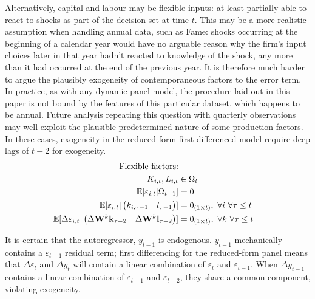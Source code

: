 Alternatively, capital and labour may be flexible inputs:
at least partially able to react to shocks
as part of the decision set at time $t$.
This may be a more realistic assumption when handling annual data, such as Fame:
shocks occurring at the beginning of a calendar year would have no arguable
reason why the firm's input choices later in that year hadn't reacted to knowledge of the shock,
any more than it had occurred at the end of the previous year.
It is therefore much harder to argue the plausibly exogeneity of contemporaneous factors to the error term.
In practice, as with any dynamic panel model, the procedure laid out in this paper
is not bound by the features of this particular dataset, which happens to be annual.
Future analysis repeating this question with quarterly observations may well
exploit the plausible predetermined nature of some production factors.
In these cases, exogeneity in the reduced form first-differenced model
require deep lags of $t-2$ for exogeneity.
\begin{align}
    \notag
    \text{Flexible factors:}
    \\ \notag
    K_{i,t}, L_{i,t} &\in \Omega_{t}
    \\ \notag
    \mathbb E[\varepsilon_{i,t}|\Omega_{t-1}] &= 0 
    \\
    \label{eq:dyn-weak-exog-flex}
    \mathbb E[
        \varepsilon_{i,t}
        \vert
        \begin{pmatrix}
            k_{i,\tau-1} & l_{\tau-1}
        \end{pmatrix}
    ] &= 0_{(1\times t)}
    ,\ \forall i\ \forall \tau\leq t
    \\
    \label{eq:dyn-weak-exog-flex-diff}
    \mathbb E[
        \Delta\varepsilon_{i,t}
        \vert
        \begin{pmatrix}
            \Delta \mathbf W^k\mathbf k_{\tau-2} & \Delta \mathbf W^k \mathbf l_{\tau-2}
        \end{pmatrix}
    ] &= 0_{(1\times t)}
    ,\ \forall k\ \forall \tau\leq t
\end{align}
\par
It is certain that the autoregressor, $y_{t-1}$ is endogenous.
$y_{t-1}$ mechanically contains a $\varepsilon_{t-1}$ residual term;
first differencing for the reduced-form panel means that $\Delta\varepsilon_t$
and $\Delta y_t$ will contain a linear combination of $\varepsilon_t$ and $\varepsilon_{t-1}$.
When $\Delta y_{t-1}$ contains a linear combination of $\varepsilon_{t-1}$ and $\varepsilon_{t-2}$,
they share a common component, violating exogeneity.
